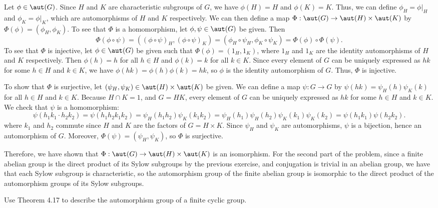 \begin{sol}
    Let $\phi \in \aut(G)$. Since $H$ and $K$ are characteristic subgroups of $G$, we have $\phi(H) = H$ and $\phi(K) = K$. Thus, we can define $\phi_H = \phi|_H$ and $\phi_K = \phi|_K$, which are automorphisms of $H$ and $K$ respectively. We can then define a map $\Phi: \aut(G) \to \aut(H) \times \aut(K)$ by $\Phi(\phi) = (\phi_H, \phi_K)$. To see that $\Phi$ is a homomorphism, let $\phi, \psi \in \aut(G)$ be given. Then
    \[\Phi(\phi \circ \psi) = ((\phi \circ \psi)_H, (\phi \circ \psi)_K) = (\phi_H \circ \psi_H, \phi_K \circ \psi_K) = \Phi(\phi) \circ \Phi(\psi).\]
    To see that $\Phi$ is injective, let $\phi \in \aut(G)$ be given such that $\Phi(\phi) = (1_H, 1_K)$, where $1_H$ and $1_K$ are the identity automorphisms of $H$ and $K$ respectively. Then $\phi(h) = h$ for all $h \in H$ and $\phi(k) = k$ for all $k \in K$. Since every element of $G$ can be uniquely expressed as $hk$ for some $h \in H$ and $k \in K$, we have $\phi(hk) = \phi(h)\phi(k) = hk$, so $\phi$ is the identity automorphism of $G$. Thus, $\Phi$ is injective.

    To show that $\Phi$ is surjective, let $(\psi_H, \psi_K) \in \aut(H) \times \aut(K)$ be given. We can define a map $\psi: G \to G$ by $\psi(hk) = \psi_H(h)\psi_K(k)$ for all $h \in H$ and $k \in K$. Because $H \cap K = 1$, and $G = HK$, every element of $G$ can be uniquely expressed as $hk$ for some $h \in H$ and $k \in K$. We check that $\psi$ is a homomorphism:
    \[\psi(h_1k_1 \cdot h_2k_2) = \psi(h_1h_2k_1k_2) = \psi_H(h_1h_2)\psi_K(k_1k_2) = \psi_H(h_1)\psi_H(h_2)\psi_K(k_1)\psi_K(k_2) = \psi(h_1k_1)\psi(h_2k_2).\]
    where $k_1$ and $h_2$ commute since $H$ and $K$ are the factors of $G = H \times K$. Since $\psi_H$ and $\psi_K$ are automorphisms, $\psi$ is a bijection, hence an automorphism of $G$. Moreover, $\Phi(\psi) = (\psi_H, \psi_K)$, so $\Phi$ is surjective.

    Therefore, we have shown that $\Phi: \aut(G) \to \aut(H) \times \aut(K)$ is an isomorphism. For the second part of the problem, since a finite abelian group is the direct product of its Sylow subgroups by the previous exercise, and conjugation is trivial in an abelian group, we have that each Sylow subgroup is characteristic, so the automorphism group of the finite abelian group is isomorphic to the direct product of the automorphism groups of its Sylow subgroups.
\end{sol}

\begin{exercise}\label{ex5.4.12}
    Use Theorem 4.17 to describe the automorphism group of a finite cyclic group.
\end{exercise}

